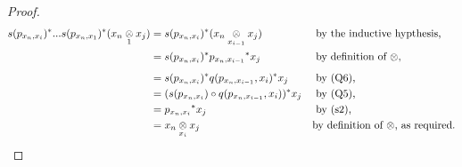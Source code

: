 \begin{proof}
\begin{align*}
s(p_{x_{n},x_{i}})^*...s(p_{x_{n},x_1})^*(\crossx{x_{n}}{x_j}{1})
& = s(p_{x_{n},x_{i}})^* (\crossx{x_{n}}{x_j}{x_{i-1}})
                                                   &&\mbox{ by the inductive hypthesis,} \\
&= s(p_{x_{n},x_{i}})^* {p_{x_n,x_{i-1}}} ^* x_j
                                                &&\mbox{ by definition of $\crossx{}{}{}$,}\\
&= s(p_{x_{n},x_{i}})^*  q(p_{x_n,x_{i-1}},x_i) ^* x_j
                                                &&\mbox{ by (Q6),}\\
&= (s(p_{x_{n},x_{i}}) \circ q(p_{x_n,x_{i-1}},x_i)) ^* x_j
                                                &&\mbox{ by (Q5),}\\
&= {p_{x_{n},x_{i}}}^*x_j
                                                &&\mbox{ by (s2),} \\
&= \crossx{x_{n}}{x_j}{x_{i}}
                                                &&\mbox{by definition of $\crossx{}{}{}$, as required.}
\end{align*}
\end{proof}